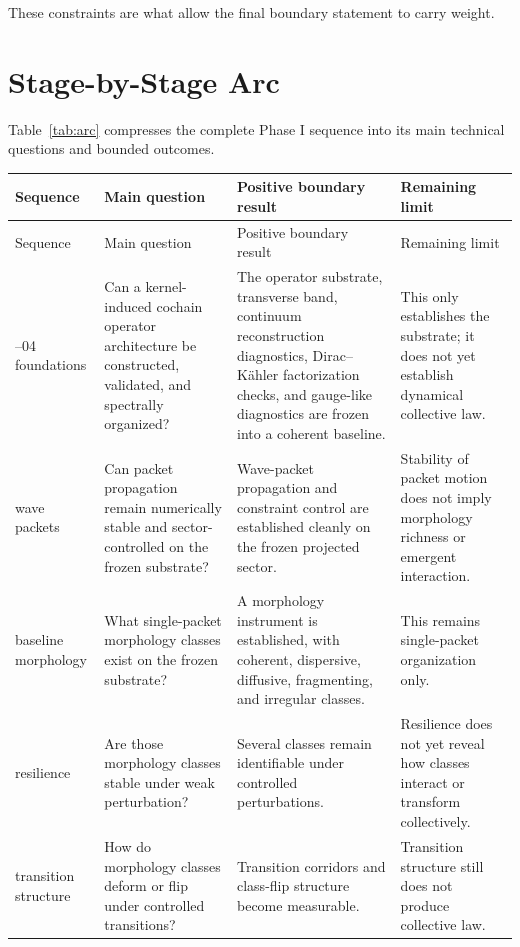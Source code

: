 \documentclass[11pt]{article}
\begin{document}
These constraints are what allow the final boundary statement to carry weight.

\section{Stage-by-Stage Arc}

Table~\ref{tab:arc} compresses the complete Phase I sequence into its main technical questions and bounded outcomes.

\begin{longtable}{>{\raggedright\arraybackslash}p{} >{\raggedright\arraybackslash}p{} >{\raggedright\arraybackslash}p{} >{\raggedright\arraybackslash}p{}}
\toprule
Sequence & Main question & Positive boundary result & Remaining limit \\
\midrule
\endfirsthead
\toprule
Sequence & Main question & Positive boundary result & Remaining limit \\
\midrule
\endhead
00--04 foundations & Can a kernel-induced cochain operator architecture be constructed, validated, and spectrally organized? & The operator substrate, transverse band, continuum reconstruction diagnostics, Dirac--K\"ahler factorization checks, and gauge-like diagnostics are frozen into a coherent baseline. & This only establishes the substrate; it does not yet establish dynamical collective law. \\
05 wave packets & Can packet propagation remain numerically stable and sector-controlled on the frozen substrate? & Wave-packet propagation and constraint control are established cleanly on the frozen projected sector. & Stability of packet motion does not imply morphology richness or emergent interaction. \\
06 baseline morphology & What single-packet morphology classes exist on the frozen substrate? & A morphology instrument is established, with coherent, dispersive, diffusive, fragmenting, and irregular classes. & This remains single-packet organization only. \\
07 resilience & Are those morphology classes stable under weak perturbation? & Several classes remain identifiable under controlled perturbations. & Resilience does not yet reveal how classes interact or transform collectively. \\
08 transition structure & How do morphology classes deform or flip under controlled transitions? & Transition corridors and class-flip structure become measurable. & Transition structure still does not produce collective law. \\

\end{longtable}
\end{document}
